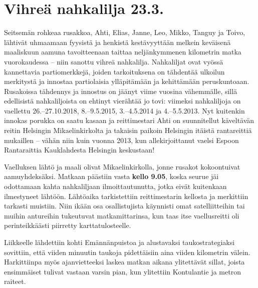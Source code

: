 
\section{Vihreä nahkalilja 23.3.}

\begin{multicols}{2}

	\noindent Seitsemän rohkeaa rusakkoa, \mbox{Ahti}, Elias, Janne, Leo, Mikko,
	\mbox{Tanguy} ja Toivo, lähtivät uhmaamaan fyysistä ja henkistä kestävyyttään
	melkein keväisenä maaliskuun aamuna tavoitteenaan taittaa
	neljänkymmenen kilometrin matka vuorokaudessa – niin sanottu vihreä
	nahkalilja. Nahkaliljat ovat vyössä kannettavia partiomerkkejä, joiden
	tarkoituksena on tähdentää ulkoilun merkitystä ja innostaa partiolaisia
	ylläpitämään ja kehittämään peruskuntoaan. Rusakoissa tähdennys ja
	innostus on jäänyt viime vuosina vähemmälle, sillä edellisistä
	nahkaliljoista on ehtinyt vierähtää jo tovi: viimeksi nahkaliljoja on
	vaellettu 26.–27.10.2018, 8.–9.5.2015, 3.–4.5.2014 ja 4.–5.5.2013. Nyt
	kuitenkin innokas porukka on saatu kasaan ja reittimestari Ahti on
	suunnitellut käveltävän reitin Helsingin Mikaelinkirkolta ja takaisin
	paikoin Helsingin itäistä rantareittiä mukaillen – vähän niin kuin
	vuonna 2013, kun allekirjoittanut vaelsi Espoon Rantaraittia
	Kauklahdesta Helsingin keskustaan!

	Vaelluksen lähtö ja maali olivat Mikaelinkirkolla, jonne rusakot
	kokoontuivat aamuyhdeksäksi. Matkaan päästiin vasta \textbf{kello
	9.05}, koska seurue jäi odottamaan kahta nahkaliljaan ilmoittautunutta,
	jotka eivät kuitenkaan ilmestyneet lähtöön. Lähtöaika tarkistettiin
	reittimestarin kellosta ja merkittiin tarkasti muistiin. Niin ikään osa
	osallistujista käynnisti omat satelliitteihin tai muihin antureihin
	tukeutuvat matkamittarinsa, kun taas itse vaellusreitti oli
	perinteikkäästi piirretty karttatulosteelle.

	Liikkeelle lähdettiin kohti Emännänpuistoa ja alustavaksi
	taukostrategiaksi sovittiin, että viiden minuutin taukoja pidettäisiin
	aina viiden kilometrin välein. Harkittiinpa myös ajanvietteeksi laskea
	matkan aikana ylitettävät sillat, joista ensimmäiset tulivat vastaan
	varsin pian, kun ylitettiin Kontulantie ja metron raiteet.


\end{multicols}
